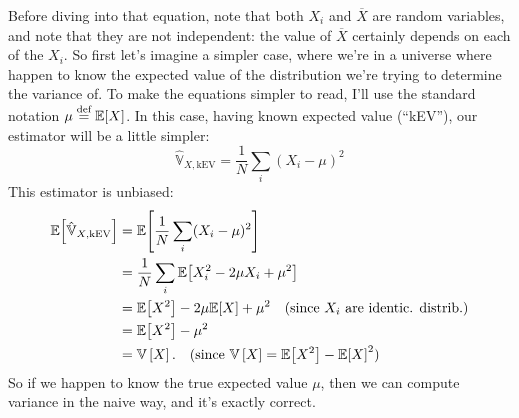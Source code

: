 Before diving into that equation, note that both $X_i$ and $\overline{X}$ are
random variables, and note that they are not independent: the value of
$\overline{X}$ certainly depends on each of the $X_i$. So first let's imagine
a simpler case, where we're in a universe where happen to know the expected
value of the distribution we're trying to determine the variance of. To make
the equations simpler to read, I'll use the standard notation $\mu \stackrel{\text{def}}{=}
\mathbb{E}\!\left[{X}\right]$. In this case, having known expected value (``kEV''), our
estimator will be a little simpler:
\begin{equation}
\hat{\mathbb{V}}_{X,\mathrm{kEV}} = \frac{1}{N} \sum_i ( X_i - \mu )^2
\end{equation}
This estimator is unbiased:
\begin{align*}
\expect{\hat{\mathbb{V}}_{X,\mathrm{kEV}}}
  &= \expect{\frac{1}{N} \sum_i ( X_i - \mu )^2} \\
  &= \frac{1}{N} \sum_i \expect{X_i^2 - 2\mu X_i + \mu^2} \\
  &= \expect{X^2} - 2 \mu \expect{X} + \mu^2 \quad\text{(since $X_i$ are identic. distrib.)} \\
  &= \expect{X^2} - \mu^2 \\
  &= \var{X}. \quad\text{(since $\var{X} = \expect{X^2} - \expect{X}^2$)}
\end{align*}
So if we happen to know the true expected value $\mu$, then we can compute
variance in the naive way, and it's exactly correct.

